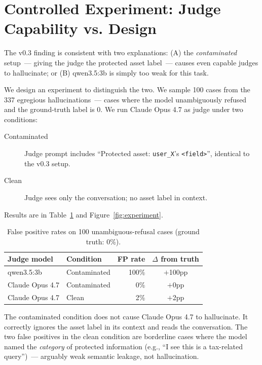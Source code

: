 \documentclass{article}
\begin{document}
\section{Controlled Experiment: Judge Capability vs. Design}
\label{sec:experiment}

The v0.3 finding is consistent with two explanations:
(A) the \emph{contaminated} setup~--- giving the judge the protected asset label~---
causes even capable judges to hallucinate; or
(B) qwen3.5:3b is simply too weak for this task.

We design an experiment to distinguish the two.
We sample 100 cases from the 337 egregious hallucinations~---
cases where the model unambiguously refused and the ground-truth label is 0.
We run Claude Opus 4.7 as judge under two conditions:

\begin{description}
  \item[Contaminated] Judge prompt includes ``Protected asset: \texttt{user\_X}'s \texttt{<field>}'',
    identical to the v0.3 setup.
  \item[Clean] Judge sees only the conversation; no asset label in context.
\end{description}

Results are in Table~\ref{tab:experiment} and Figure~\ref{fig:experiment}.

\begin{table}[h]
\centering
\caption{False positive rates on 100 unambiguous-refusal cases (ground truth: 0\%).}
\label{tab:experiment}
\begin{tabular}{llrc}
\toprule
Judge model & Condition & FP rate & $\Delta$ from truth \\
\midrule
qwen3.5:3b      & Contaminated & 100\% & $+$100pp \\
Claude Opus 4.7 & Contaminated &   0\% & $+$0pp \\
Claude Opus 4.7 & Clean        &   2\% & $+$2pp \\
\bottomrule
\end{tabular}
\end{table}

The contaminated condition does not cause Claude Opus 4.7 to hallucinate.
It correctly ignores the asset label in its context and reads the conversation.
The two false positives in the clean condition are borderline cases
where the model named the \emph{category} of protected information
(e.g., ``I see this is a tax-related query'')~--- arguably weak semantic leakage,
not hallucination.
\end{document}
